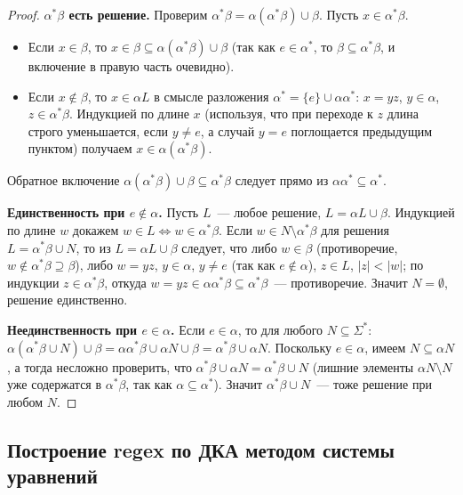 \documentclass[12pt]{article}
\begin{document}
	\begin{proof}
		\textbf{$\alpha^*\beta$ есть решение.} Проверим $\alpha^*\beta = \alpha(\alpha^*\beta) \cup \beta$. Пусть $x \in \alpha^*\beta$.
		\begin{itemize}
			\item Если $x \in \beta$, то $x \in \beta \subseteq \alpha(\alpha^*\beta) \cup \beta$ (так как $e \in \alpha^*$, то $\beta \subseteq \alpha^*\beta$, и включение в правую часть очевидно).
			\item Если $x \notin \beta$, то $x \in \alpha L$ в смысле разложения $\alpha^* = \{e\} \cup \alpha\alpha^*$: $x = yz$, $y \in \alpha$, $z \in \alpha^*\beta$. Индукцией по длине $x$ (используя, что при переходе к $z$ длина строго уменьшается, если $y \neq e$, а случай $y = e$ поглощается предыдущим пунктом) получаем $x \in \alpha(\alpha^*\beta)$.
		\end{itemize}
		Обратное включение $\alpha(\alpha^*\beta)\cup\beta \subseteq \alpha^*\beta$ следует прямо из $\alpha \alpha^* \subseteq \alpha^*$.
		
		\textbf{Единственность при $e \notin \alpha$.} Пусть $L$~--- любое решение, $L = \alpha L \cup \beta$. Индукцией по длине $w$ докажем $w \in L \Leftrightarrow w \in \alpha^*\beta$. Если $w \in N \setminus \alpha^*\beta$ для решения $L = \alpha^*\beta \cup N$, то из $L = \alpha L \cup \beta$ следует, что либо $w \in \beta$ (противоречие, $w \notin \alpha^*\beta \supseteq \beta$), либо $w = yz$, $y \in \alpha$, $y \neq e$ (так как $e \notin \alpha$), $z \in L$, $|z| < |w|$; по индукции $z \in \alpha^*\beta$, откуда $w = yz \in \alpha \alpha^*\beta \subseteq \alpha^*\beta$~--- противоречие. Значит $N = \emptyset$, решение единственно.
		
		\textbf{Неединственность при $e \in \alpha$.} Если $e \in \alpha$, то для любого $N \subseteq \Sigma^*$: $\alpha(\alpha^*\beta \cup N) \cup \beta = \alpha\alpha^*\beta \cup \alpha N \cup \beta = \alpha^*\beta \cup \alpha N$. Поскольку $e \in \alpha$, имеем $N \subseteq \alpha N$, а тогда несложно проверить, что $\alpha^*\beta \cup \alpha N = \alpha^*\beta \cup N$ (лишние элементы $\alpha N \setminus N$ уже содержатся в $\alpha^*\beta$, так как $\alpha \subseteq \alpha^*$). Значит $\alpha^*\beta \cup N$~--- тоже решение при любом $N$.
	\end{proof}
	
	\subsection{Построение regex по ДКА методом системы уравнений}
	
\end{document}
